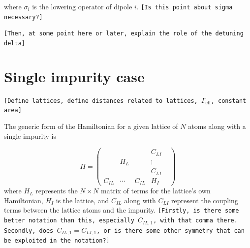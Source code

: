 \documentclass[aps,pra,superscriptaddress,twocolumn]{revtex4-1}
\newcommand{\commentSB}[1]{\texttt{\color{blue}[#1]}}
\newcommand{\commentSO}[1]{\texttt{\color{orange}[#1]}}
\begin{document}
where $\sigma_i$ is the lowering operator of dipole $i$. 
\commentSB{Is this point about sigma necessary?}

\commentSB{Then, at some point here or later, explain the role of the detuning delta}

\section{Single impurity case}
\commentSO{Define lattices, define distances related to lattices, $\Gamma_\mathrm{eff}$, constant area}


The generic form of the Hamiltonian for a given lattice of $N$ atoms along with a single impurity is 

\begin{equation}
    H = \begin{pmatrix}
        ~ & ~ & ~ &   C_{LI} \\ 
        ~ & H_L & ~ & \vdots \\
        ~ & ~ & ~ & C_{LI} & \\
        C_{IL} & \cdots & C_{IL} & H_I   
    \end{pmatrix}
    \label{eqn:blockH1}
\end{equation}
where $H_L$ represents the $N \times N$ matrix of terms for the lattice's own Hamiltonian, $H_I$ is the lattice, and $C_{IL}$ along with $C_{LI}$ represent the coupling terms between the lattice atoms and the impurity. 
\commentSB{Firstly, is there some better notation than this, especially $C_{IL,1}$, with that comma there. Secondly, does $C_{IL,1} = C_{LI,1}$, or is there some other symmetry that can be exploited in the notation?}
\end{document}
